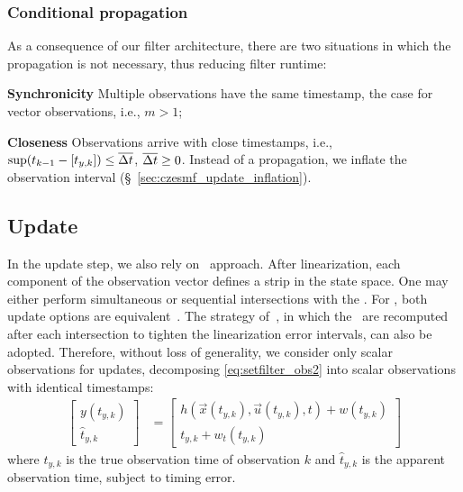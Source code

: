 \documentclass{ifacconf}
\begin{document}
\subsubsection{Conditional propagation}

As a consequence of our filter architecture, there are two situations in which the propagation is not necessary, thus reducing filter runtime:
\begin{enumerate*}
\item \textbf{Synchronicity} Multiple observations have the same timestamp, the case for vector observations, i.e., $m>1$;
\item \textbf{Closeness}  Observations arrive with close timestamps, i.e., ${\sup(t_{k-1} - [t_{y,k}])}\leq\overline{\Delta {t}}$, ${\overline{\Delta t} \geq 0}$. Instead of a propagation, we inflate the observation interval (\S~\ref{sec:czesmf_update_inflation}).
\end{enumerate*}


\subsection{Update}\label{sec:czesmf_update}
\vspace{-0.2cm}
In the update step, we also rely on \linearinclusionlong\ approach. After linearization, each component of the observation vector defines a strip in the state space. One may either perform simultaneous or sequential intersections with the \cz.
For \czs, both update options are equivalent~\citep{scott2016constrained}. The strategy of~\cite{Bolting2018b}, in which the \linearinclusions\ are recomputed after each intersection to tighten the linearization error intervals, can also be adopted.
Therefore, without loss of generality, we consider only scalar observations for updates,
decomposing \eqref{eq:setfilter_obs2} into scalar observations with identical timestamps:
\begin{align}
  \begin{bmatrix}
    y(t_{y,k}) \\ \hat{t}_{y,k}
  \end{bmatrix}
  &=
    \begin{bmatrix}
      h(\vec{x}(t_{y,k}), \vec{u}(t_{y,k}), t) + w(t_{y,k}) \\
      t_{y,k} + w_t(t_{y,k})
    \end{bmatrix}
    \label{eq:setfilter_obs}
\end{align}
where $t_{y,k}$ is the true observation time of observation $k$ and $\hat{t}_{y,k}$ is the apparent observation time, subject to timing error.
\end{document}
